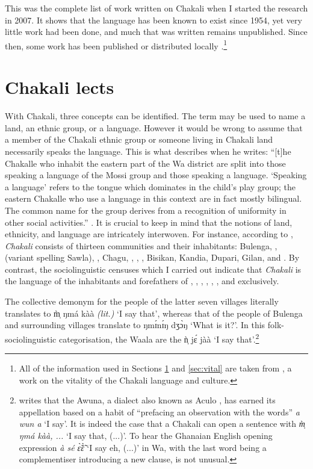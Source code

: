 This was the complete list of work written on Chakali when I started the research in 2007. It shows that the language has been known to exist since 1954, yet very little work had been done, and much that was written  remains unpublished. Since then, some work has been published or distributed locally \citep{Kang07b, Kang07a,  brin08b, brin08, brin10, brin11, Brin12, brin15c, brin16}.\footnote{All of the information used in Sections \ref{sec:lects} and \ref{sec:vital}  are taken from \citet{brin15c}, a work on the vitality of the Chakali language and culture.}

\section{Chakali lects}
\label{sec:lects}

With Chakali,    three concepts can be identified. The term may be used  to name a land,  an ethnic group,   or a language.  However it would be wrong to assume that a member of the Chakali ethnic group  or someone living in Chakali land necessarily speaks the language.  This is what \citeauthor{Good54} describes when he writes: ``[t]he Chakalle who inhabit the eastern part of the Wa district are split into those speaking a language of the Mossi group and those speaking a  language. `Speaking a language' refers to the tongue which dominates in the child's play group; the eastern Chakalle who use a  language in this context are in fact mostly bilingual. The common name for the group derives from a recognition of uniformity in other social activities.''   \citet[2]{Good54}.  It is crucial to keep in mind that the notions of land, ethnicity, and language are intricately interwoven.   For instance, according to \citet{Daan94},  {\it Chakali}  consists of  thirteen communities and their inhabitants:  Bulenga, ,  ({variant} spelling Sawla), , Chagu, , , , Bisikan, Kandia, Dupari, Gilan, and .  By contrast, the sociolinguistic censuses which I carried out indicate that {\it Chakali} is the language of the inhabitants and forefathers of  , , ,  , , , and   exclusively. 

The collective demonym for the people of the latter seven villages literally translates to {\sls m̩̀ ŋmá kàà} {\it (lit.)}   `I say that', whereas that of  the people of Bulenga and surrounding villages translate to   {\sls ŋmɪ́nɪ́ŋ dʒɔ̀ŋ}  `What is it?'.   In this folk-sociolinguistic categorisation, the Waala are the {\sls ǹ̩ jɛ́ jàà} `I say that'.\footnote{\citet[525]{Ratt32b} writes that the Awuna, a  dialect also  known as Aculo \citep[147]{nade89}, has earned its appellation based on a habit of ``prefacing an observation with the words''  {\it a wun a} `I say'.  It is indeed the case that a Chakali can open a sentence with  {\it m̩̀ ŋmá kàà, ...}  `I say that, (...)'. To hear the  Ghanaian English opening expression {\it à sé ɛ̃̀ɛ̃̀}  `I say eh, (...)'   in Wa, with the last word being a complementiser introducing a new clause, is not unusual.}  

